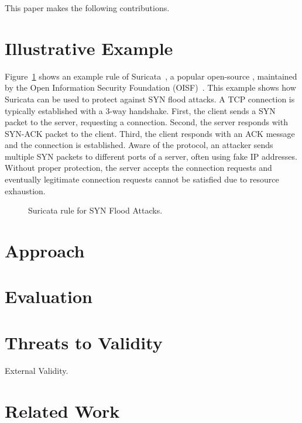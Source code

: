 \documentclass[conference]{IEEEtran}
\begin{document}


This paper makes the following contributions. 

\section{Illustrative Example}
\label{sec:suri-metas-coverage}

Figure~\ref{fig:synflood-example} shows an
example rule of Suricata~\cite{suricata}, a popular open-source
\nids{}, maintained by the Open Information Security Foundation
(OISF)~\cite{oisf}. This example shows how Suricata can be used to
protect against SYN flood attacks. A TCP connection is typically
established with a 3-way handshake. First, the client sends a SYN
packet to the server, requesting a connection. Second, the server
responds with SYN-ACK packet to the client. Third, the client responds
with an ACK message and the connection is established. Aware of the
protocol, an attacker sends multiple SYN packets to different ports of
a server, often using fake IP addresses. Without proper protection,
the server accepts the connection requests and eventually legitimate
connection requests cannot be satisfied due to resource exhaustion.

\begin{figure}[t]
  
  \caption{Suricata rule for SYN Flood Attacks.}
  \label{fig:synflood-example}
\end{figure}


\section{Approach}


\section{Evaluation}


\section{Threats to Validity}

External Validity. 

\section{Related Work}


\balance


\end{document}
